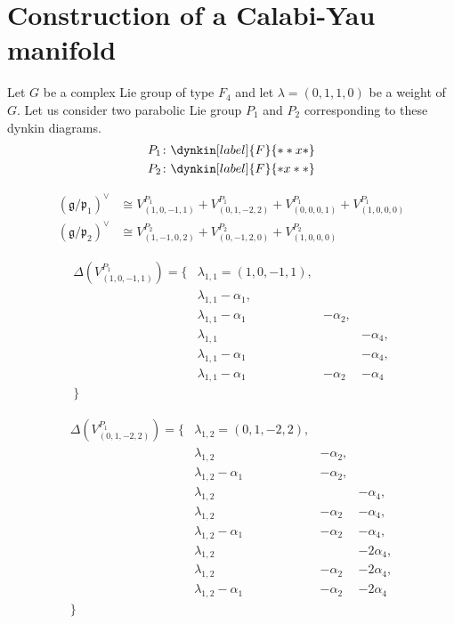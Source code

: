 \documentclass[uplatex,dvipdfmx]{jsarticle}
\begin{document}
\section{Construction of a Calabi-Yau manifold}

Let
$G$
be a complex Lie group of type
$F_4$
and let
$\lambda = \left( 0, 1, 1, 0 \right)$
be a weight
of
$G$.
Let us consider two parabolic Lie group
$P_1$
and
$P_2$
corresponding to these dynkin diagrams.
\begin{align}
    P_1\colon \dynkin[label]{F}{**x*} \\
    P_2\colon \dynkin[label]{F}{*x**}
\end{align}


\begin{align}
    \left( \mathfrak{g}/\mathfrak{p_1} \right)^\vee
    &\cong
    V^{P_1}_{(1, 0, -1, 1)}
    +
    V^{P_1}_{(0, 1, -2, 2)}
    +
    V^{P_1}_{(0, 0, 0, 1)}
    +
    V^{P_1}_{(1, 0, 0, 0)} \\
    \left( \mathfrak{g}/\mathfrak{p_2} \right)^\vee
    &\cong
    V^{P_2}_{(1, -1, 0, 2)}
    +
    V^{P_2}_{(0, -1, 2, 0)}
    +
    V^{P_2}_{(1, 0, 0, 0)}
\end{align}


\begin{equation}
    \begin{alignedat}{2}
        \Delta\left( V^{P_1}_{(1, 0, -1, 1)} \right)
        =
        \{ 
            &\lambda_{1, 1} = (1, 0, -1, 1),\\
            &\lambda_{1, 1} - \alpha_1,\\
            &\lambda_{1, 1} - \alpha_1 &- \alpha_2,\\
            &\lambda_{1, 1} &&- \alpha_4,\\
            &\lambda_{1, 1} - \alpha_1 &&- \alpha_4,\\
            &\lambda_{1, 1} - \alpha_1 &- \alpha_2 &- \alpha_4\\
        \}
    \end{alignedat}
\end{equation}

\begin{equation}
    \begin{alignedat}{2}
        \Delta\left( V^{P_1}_{(0, 1, -2, 2)} \right)
        =
        \{
            &\lambda_{1,2} = (0, 1, -2, 2),\\
            &\lambda_{1,2} &- \alpha_2,\\
            &\lambda_{1,2} - \alpha_1 &- \alpha_2,\\
            &\lambda_{1,2} &&- \alpha_4,\\
            &\lambda_{1,2} &- \alpha_2 &- \alpha_4,\\
            &\lambda_{1,2} - \alpha_1 &- \alpha_2 &- \alpha_4,\\
            &\lambda_{1,2} &&- 2\alpha_4,\\
            &\lambda_{1,2} &- \alpha_2 &- 2\alpha_4,\\
            &\lambda_{1,2} - \alpha_1 &- \alpha_2 &- 2\alpha_4\\
            \}
    \end{alignedat}
\end{equation}
\end{document}
